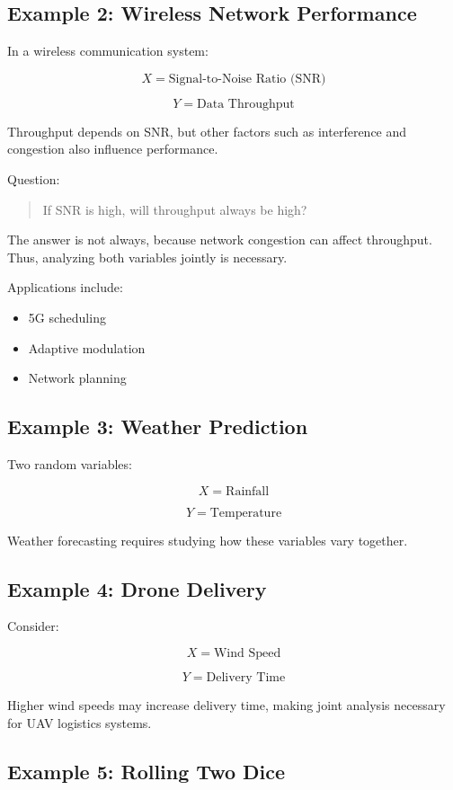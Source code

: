 \documentclass[12pt]{article}
\begin{document}
\subsection{Example 2: Wireless Network Performance}

In a wireless communication system:

\[
X = \text{Signal-to-Noise Ratio (SNR)}
\]

\[
Y = \text{Data Throughput}
\]

Throughput depends on SNR, but other factors such as interference and congestion also influence performance.

Question:

\begin{quote}
If SNR is high, will throughput always be high?
\end{quote}

The answer is not always, because network congestion can affect throughput. 
Thus, analyzing both variables jointly is necessary.

Applications include:

\begin{itemize}
\item 5G scheduling
\item Adaptive modulation
\item Network planning
\end{itemize}

\subsection{Example 3: Weather Prediction}

Two random variables:

\[
X = \text{Rainfall}
\]

\[
Y = \text{Temperature}
\]

Weather forecasting requires studying how these variables vary together.

\subsection{Example 4: Drone Delivery}

Consider:

\[
X = \text{Wind Speed}
\]

\[
Y = \text{Delivery Time}
\]

Higher wind speeds may increase delivery time, making joint analysis necessary for UAV logistics systems.

\subsection{Example 5: Rolling Two Dice}
\end{document}
